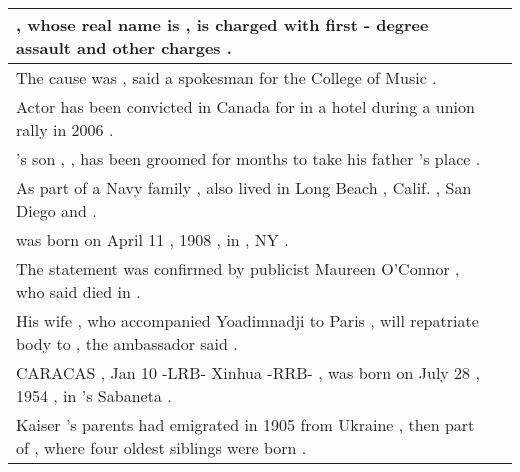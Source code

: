 \begin{longtable}{p{} P{1,4cm} }
\hline
{} {\underline{} , whose real name is \underline{} , is charged with first - degree assault and other charges .} &    \\ 
\hline
{} {The cause was \underline{} , said a spokesman for the \underline{} College of Music .} &    \\ 
\hline
{} {Actor \underline{} has been convicted in Canada for \underline{} in a hotel during a union rally in 2006 .} &    \\ 
\hline
{} {\underline{} 's son , \underline{} , has been groomed for months to take his father 's place .} &    \\ 
\hline
{} {As part of a Navy family , \underline{} also lived in Long Beach , Calif. , San Diego and \underline{} .} &    \\ 
\hline
{} {\underline{} was born on April 11 , 1908 , in \underline{} , NY .} &    \\ 
\hline
{} {The statement was confirmed by publicist Maureen O'Connor , who said \underline{} died in \underline{} .} &    \\ 
\hline
{} {His wife , who accompanied Yoadimnadji to Paris , will repatriate \underline{} body to \underline{} , the ambassador said .} &    \\ 
\hline
{} {CARACAS , Jan 10 -LRB- Xinhua -RRB- \underline{} , was born on July 28 , 1954 , in \underline{} 's Sabaneta .} &    \\ 
\hline
{} {Kaiser 's parents had emigrated in 1905 from Ukraine , then part of \underline{} , where \underline{} four oldest siblings were born .} &    \\ 

\end{longtable}
